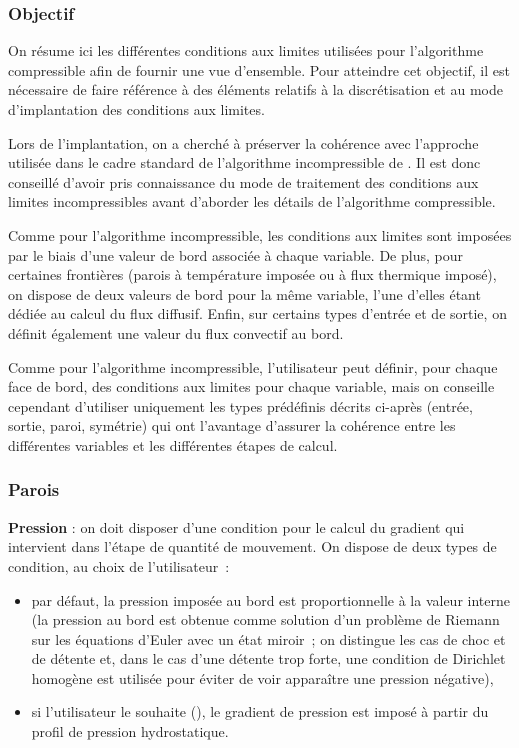 \subsubsection*{Objectif}

On r\'esume ici les diff\'erentes conditions aux limites utilis\'ees pour l'algorithme
compressible afin de fournir une vue d'ensemble. Pour atteindre cet objectif,
il est n\'ecessaire de faire r\'ef\'erence \`a  des \'el\'ements relatifs
\`a la discr\'etisation et au mode d'implantation des conditions aux limites.

Lors de l'implantation, on a cherch\'e \`a pr\'eserver la coh\'erence avec l'approche
utilis\'ee dans le cadre standard de l'algorithme incompressible de \CS.
Il est donc conseill\'e d'avoir pris connaissance du mode de traitement des conditions
aux limites incompressibles avant d'aborder les d\'etails de l'algorithme compressible.

Comme pour l'algorithme incompressible, les conditions aux limites sont impos\'ees
par le biais d'une valeur de bord associ\'ee \`a chaque variable. De plus,
pour certaines
fronti\`eres (parois \`a temp\'erature impos\'ee ou \`a flux thermique impos\'e),
on dispose de deux valeurs de bord pour la m\^eme variable, l'une d'elles \'etant d\'edi\'ee au calcul du
flux diffusif.
Enfin, sur certains types d'entr\'ee et de sortie, on d\'efinit \'egalement
une valeur du flux convectif au bord.

Comme pour l'algorithme incompressible, l'utilisateur peut d\'efinir,
pour chaque face
de bord, des conditions aux limites pour chaque variable, mais on conseille cependant
d'utiliser uniquement les types pr\'ed\'efinis
d\'ecrits ci-apr\`es (entr\'ee,
sortie, paroi, sym\'etrie) qui ont l'avantage d'assurer la coh\'erence entre
les diff\'erentes variables et les diff\'erentes \'etapes de calcul.


\subsubsection*{Parois}

{\bf Pression} : on doit disposer d'une condition pour le calcul du gradient
qui intervient dans l'\'etape de quantit\'e de mouvement.
On dispose de deux types de condition, au choix de l'utilisateur~:
\begin{itemize}
\item par d\'efaut, la pression impos\'ee au bord est proportionnelle
\`a la valeur interne (la pression au bord est obtenue comme solution
d'un probl\`eme de Riemann sur les \'equations d'Euler
avec un \'etat miroir~; on distingue les cas de choc et de
d\'etente et, dans le cas d'une d\'etente trop forte, une condition de
Dirichlet homog\`ene est utilis\'ee pour \'eviter de voir appara\^itre une
pression n\'egative),
\item si l'utilisateur le souhaite (), le gradient de
pression est impos\'e \`a partir du profil de pression hydrostatique.
\end{itemize}
\bigskip

